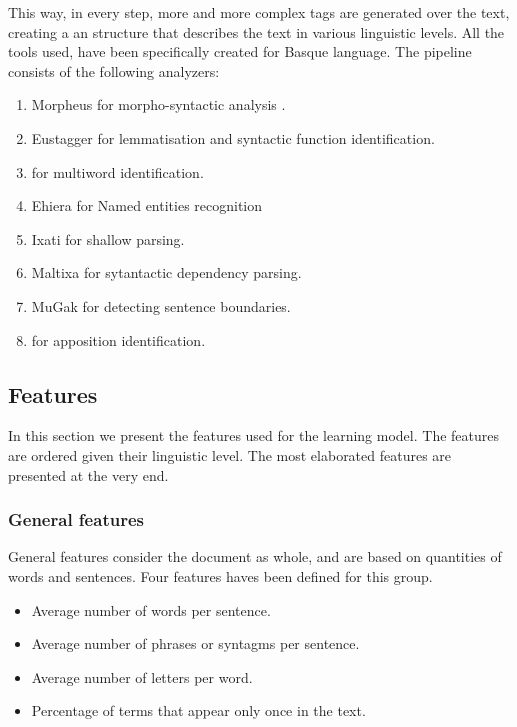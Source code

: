 \documentclass{acm_proc_article-sp}
\begin{document}
This way, in every step, more and more complex tags are generated over the text, creating a an structure that describes the text in various linguistic levels. All the tools used, have been specifically created for Basque language. The pipeline consists of the following analyzers:


\begin{enumerate}
\item Morpheus \cite{alegria2002robustness} for morpho-syntactic analysis .
\item Eustagger \cite{aduriz2003finite} for lemmatisation and syntactic function identification.

\item \cite{alegria2004representation} for multiword identification.

\item Ehiera \cite{alegria2004design} for Named entities recognition

\item Ixati \cite{aduriz2004cascaded} for shallow parsing.

\item Maltixa \cite{bengoetxea2010application} for sytantactic dependency parsing.

\item MuGak \cite{ aranzabe2013transforming}for detecting sentence boundaries.
\item \cite{gonzalez2013detecting} for apposition identification.

\end{enumerate}



\subsection{Features}
In this section we present the features used for the learning model. The features are ordered given their linguistic level. The most elaborated features are presented at the very end.

\subsubsection{General features}
General features consider the document as whole, and are based on quantities of words and sentences. Four features haves been defined for this group.

\begin{itemize}
\item Average number of words per sentence.
\item Average number of phrases or syntagms per sentence.
\item Average number of letters per word.
\item Percentage of terms that appear only once in the text.
\end{itemize}
\end{document}
